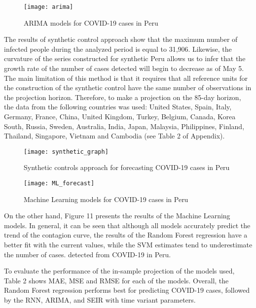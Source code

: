 \documentclass[12pt]{article}
\begin{document}
\begin{figure}[h]
\centering
\texttt{[image: arima]}
\caption{ARIMA models for COVID-19 cases in Peru}
\end{figure}

The results of synthetic control approach show that the maximum number of infected people during the analyzed period is equal to 31,906. Likewise, the curvature of the series constructed for synthetic Peru allows us to infer that the growth rate of the number of cases detected will begin to decrease as of May 5. The main limitation of this method is that it requires that all reference units for the construction of the synthetic control have the same number of observations in the projection horizon. Therefore, to make a projection on the 85-day horizon, the data from the following countries was used: United States, Spain, Italy, Germany, France, China, United Kingdom, Turkey, Belgium, Canada, Korea South, Russia, Sweden, Australia, India, Japan, Malaysia, Philippines, Finland, Thailand, Singapore, Vietnam and Cambodia (see Table 2 of Appendix).

\begin{figure}[h]
  \centering
\texttt{[image: synthetic\_graph]}
\caption{Synthetic controls approach for forecasting COVID-19 cases in Peru}

  \vspace{5mm}
  \vspace{5mm}
    \vspace{5mm}
    
\texttt{[image: ML\_forecast]}
\caption{Machine Learning models for COVID-19 cases in Peru}
\end{figure}

\clearpage

On the other hand, Figure 11 presents the results of the Machine Learning models. In general, it can be seen that although all models accurately predict the trend of the contagion curve, the results of the Random Forest regression have a better fit with the current values, while the SVM estimates tend to underestimate the number of cases. detected from COVID-19 in Peru.

To evaluate the performance of the in-sample projection of the models used, Table 2 shows MAE, MSE and RMSE for each of the models. Overall, the Random Forest regression performs best for predicting COVID-19 cases, followed by the RNN, ARIMA, and SEIR with time variant parameters.
\end{document}
